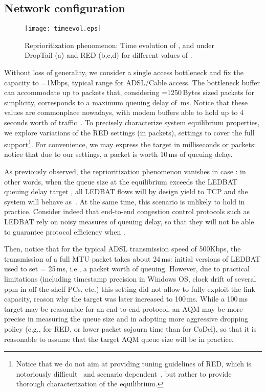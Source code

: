 \documentclass[conference]{IEEEtran}
\newcommand{\figLC}[2]{
		\caption{#2}
		\label{fig:#1}
}
\begin{document}
\subsection{Network configuration}


\begin{figure*}[t]
    \begin{center}
        \texttt{[image: timeevol.eps]}
        \figLC{time}{Reprioritization phenomenon: Time evolution of ,  and  under DropTail (a) and RED (b,c,d) for different values of . }
    \end{center}
\end{figure*}


Without loss of generality, we consider a single access bottleneck and fix the capacity to =1Mbps, typical range for ADSL/Cable access. The bottleneck buffer can accommodate up to  packets that, considering =1250\,Bytes sized packets for simplicity, corresponds to a maximum queuing delay of \,ms. Notice that these values are commonplace nowadays, with modem buffers able to hold up to 4\,seconds worth of traffic~\cite{kreibich2010netalyzr}. 
To precisely characterize system equilibrium properties, we explore variations of the RED settings  (in packets),  settings to cover the full support\footnote{Notice that we do not aim at providing tuning guidelines of RED, which is notoriously difficult~\cite{red_tuning} and scenario dependent~\cite{hollot01infocom}, but rather to provide thorough characterization of the equilibrium.}. For convenience, we may express the target  in milliseconds or packets: notice that due to our settings, a packet is worth 10\,ms of queuing delay.


As previously observed, the reprioritization phenomenon vanishes in case : in other words, when the queue size at the equilibrium exceeds the LEDBAT queuing delay target , all LEDBAT flows will by design yield to TCP and the system will behave as~\cite{misra00sigcomm,hollot01infocom}. At the same time, this scenario is unlikely to hold in practice. Consider indeed that end-to-end congestion control protocols such as LEDBAT rely on noisy measures of queuing delay, so that they will not be able to guarantee protocol efficiency when .
 
Then, notice that for the typical ADSL transmission speed of 500Kbps, the transmission  of a full MTU packet takes about 24\,ms: initial versions of LEDBAT used to set  = 25\,ms, i.e., a packet worth of queuing. However, due to practical limitations (including timestamp precision in Windows OS, clock drift of several ppm in off-the-shelf PCs, etc.) this  setting did not allow to fully exploit the link capacity, reason why the target was later increased to 100\,ms. While a 100\,ms target may be reasonable for an end-to-end protocol, an AQM may be more precise in measuring the queue size and in adopting more aggressive dropping policy (e.g.,  for RED, or lower packet sojourn time than   for CoDel), so that it is reasonable to assume that the target AQM queue size will be  in practice.
 
\end{document}

